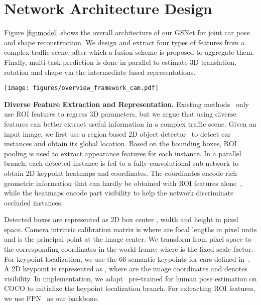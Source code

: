 \documentclass[runningheads]{llncs}
\begin{document}
\section{Network Architecture Design}
Figure \ref{fig:model} shows the overall architecture of our GSNet for joint car pose and shape reconstruction. We design and extract four types of features from a complex traffic scene, after which a fusion scheme is proposed to aggregate them. Finally, multi-task prediction is done in parallel to estimate 3D translation, rotation and shape via the intermediate fused representations.

\begin{figure*}[!t]
	\centering
	\texttt{[image: figures/overview\_framework\_cam.pdf]}
	\caption{Overview of our GSNet for joint vehicle pose and shape reconstruction. We use region-based 2D object detector~\cite{he2017mask} and a built-in heatmap regression branch to obtain ROI features, detected boxes, keypoint coordinates (global locations in the whole image) and corresponding heatmap (local positions and visibility in sub-region). GSNet performs an effective fusion of four-way input representations and builds three parallel branches respectively for 3D translation, rotation and shape estimation. 3D shape reconstruction is detailed in Figure~\ref{fig:example2} and our hybrid loss function is illustrated in section~\ref{sec:constraint}.}
	\label{fig:model}
\end{figure*}

\smallskip\noindent\textbf{Diverse Feature Extraction and Representation.}
Existing methods~\cite{kundu20183d,xiang2017posecnn} only use ROI features to regress 3D parameters, but we argue that using diverse features can better extract useful information in a complex traffic scene. Given an input image, we first use a region-based 2D object detector~\cite{he2017mask} to detect car instances and obtain its global location. Based on the bounding boxes, ROI pooling is used to extract appearance features for each instance. In a parallel branch, each detected instance is fed to a fully-convolutional sub-network to obtain 2D keypoint heatmaps and coordinates. The coordinates encode rich geometric information that can hardly be obtained with ROI features alone~\cite{zhao2017simple}, while the heatmaps encode part visibility to help the network discriminate occluded instances. 

Detected boxes are represented as 2D box center , width  and height  in pixel space.
Camera intrinsic calibration matrix is  where  are focal lengths in pixel units and  is the principal point at the image center.
We transform  from pixel space to the corresponding coordinates  in the world frame: 
where  is the fixed scale factor. For keypoint localization, we use the 66 semantic keypoints for cars defined in~\cite{song2019apollocar3d}. A 2D keypoint is represented as , where  are the image coordinates and  denotes visibility. In implementation, we adapt~\cite{he2017mask} pre-trained for human pose estimation on COCO to initialize the keypoint localization branch. For extracting ROI features, we use FPN~\cite{lin2017feature} as our backbone.
\end{document}
